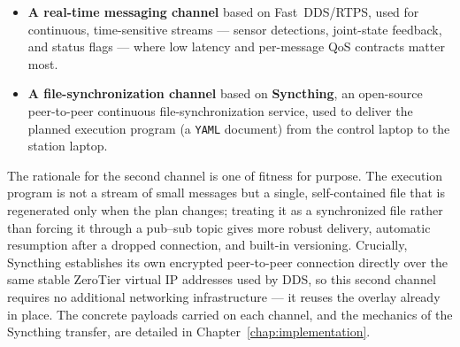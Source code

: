 \begin{itemize}
    \item \textbf{A real-time messaging channel} based on Fast~DDS/RTPS, used for continuous, time-sensitive streams --- sensor detections, joint-state feedback, and status flags --- where low latency and per-message QoS contracts matter most.
    \item \textbf{A file-synchronization channel} based on \textbf{Syncthing}, an open-source peer-to-peer continuous file-synchronization service, used to deliver the planned execution program (a \texttt{YAML} document) from the control laptop to the station laptop.
\end{itemize}

The rationale for the second channel is one of fitness for purpose. The execution program is not a stream of small messages but a single, self-contained file that is regenerated only when the plan changes; treating it as a synchronized file rather than forcing it through a pub--sub topic gives more robust delivery, automatic resumption after a dropped connection, and built-in versioning. Crucially, Syncthing establishes its own encrypted peer-to-peer connection directly over the same stable ZeroTier virtual IP addresses used by DDS, so this second channel requires no additional networking infrastructure --- it reuses the overlay already in place. The concrete payloads carried on each channel, and the mechanics of the Syncthing transfer, are detailed in Chapter~\ref{chap:implementation}.